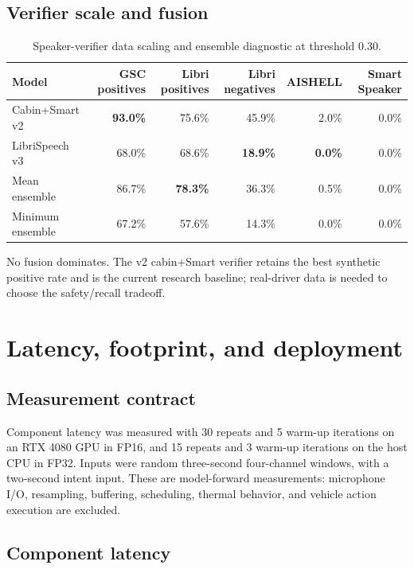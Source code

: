 \documentclass[11pt,a4paper]{article}
\begin{document}
\subsection{Verifier scale and fusion}

\begin{table}[H]
\centering
\caption{Speaker-verifier data scaling and ensemble diagnostic at threshold
0.30.}
\label{tab:verifier-ablation}
\small
\begin{tabular}{@{}lrrrrr@{}}
\toprule
\textbf{Model} & \textbf{GSC positives} & \textbf{Libri positives} & \textbf{Libri negatives} & \textbf{AISHELL} & \textbf{Smart Speaker}\\
\midrule
Cabin+Smart v2 & \textbf{93.0\%} & 75.6\% & 45.9\% & 2.0\% & 0.0\%\\
LibriSpeech v3 & 68.0\% & 68.6\% & \textbf{18.9\%} & \textbf{0.0\%} & 0.0\%\\
Mean ensemble & 86.7\% & \textbf{78.3\%} & 36.3\% & 0.5\% & 0.0\%\\
Minimum ensemble & 67.2\% & 57.6\% & 14.3\% & 0.0\% & 0.0\%\\
\bottomrule
\end{tabular}
\end{table}

No fusion dominates. The v2 cabin+Smart verifier retains the best synthetic
positive rate and is the current research baseline; real-driver data is
needed to choose the safety/recall tradeoff.

\section{Latency, footprint, and deployment}

\subsection{Measurement contract}

Component latency was measured with 30 repeats and 5 warm-up iterations on
an RTX 4080 GPU in FP16, and 15 repeats and 3 warm-up iterations on the host
CPU in FP32. Inputs were random three-second four-channel windows, with a
two-second intent input. These are model-forward measurements: microphone
I/O, resampling, buffering, scheduling, thermal behavior, and vehicle action
execution are excluded.

\subsection{Component latency}
\end{document}
